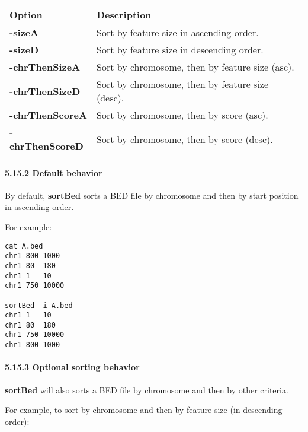 \documentclass[letterpaper,10pt,english]{sphinxmanual}
\begin{document}
\begin{tabulary}{\linewidth}{|L|L|}
\hline
\textbf{
Option
} & \textbf{
Description
}\\\hline

\textbf{-sizeA}
 & 
Sort by feature size in ascending order.
\\\hline

\textbf{-sizeD}
 & 
Sort by feature size in descending order.
\\\hline

\textbf{-chrThenSizeA}
 & 
Sort by chromosome, then by feature size (asc).
\\\hline

\textbf{-chrThenSizeD}
 & 
Sort by chromosome, then by feature size (desc).
\\\hline

\textbf{-chrThenScoreA}
 & 
Sort by chromosome, then by score (asc).
\\\hline

\textbf{-chrThenScoreD}
 & 
Sort by chromosome, then by score (desc).
\\\hline
\end{tabulary}



\paragraph{5.15.2 Default behavior}
\label{content/sortBed:default-behavior}
By default, \textbf{sortBed} sorts a BED file by chromosome and then by start position in ascending order.

For example:

\begin{Verbatim}[commandchars=\\\{\}]
cat A.bed
chr1 800 1000
chr1 80  180
chr1 1   10
chr1 750 10000

sortBed -i A.bed
chr1 1   10
chr1 80  180
chr1 750 10000
chr1 800 1000
\end{Verbatim}


\paragraph{5.15.3 Optional sorting behavior}
\label{content/sortBed:optional-sorting-behavior}
\textbf{sortBed} will also sorts a BED file by chromosome and then by other criteria.

For example, to sort by chromosome and then by feature size (in descending order):
\end{document}
